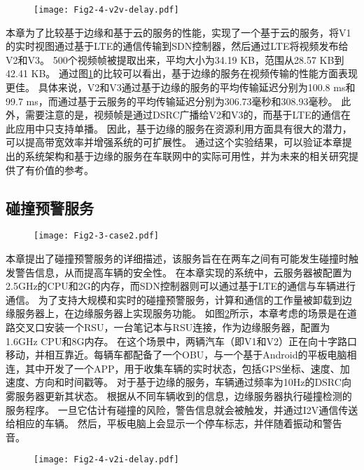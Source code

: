 \begin{figure}[h]
\centering
  \texttt{[image: Fig2-4-v2v-delay.pdf]}
  \label{fig 2-4}
\end{figure}

本章为了比较基于边缘和基于云的服务的性能，实现了一个基于云的服务，将V1的实时视图通过基于LTE的通信传输到SDN控制器，然后通过LTE将视频发布给V2和V3。
500个视频帧被提取出来，平均大小为34.19 KB，范围从28.57 KB到42.41 KB。
通过图\ref{fig 2-4}的比较可以看出，基于边缘的服务在视频传输的性能方面表现更佳。
具体来说，V2和V3通过基于边缘的服务的平均传输延迟分别为100.8 ms和99.7 ms，而通过基于云服务的平均传输延迟分别为306.73毫秒和308.93毫秒。
此外，需要注意的是，视频帧是通过DSRC广播给V2和V3的，而基于LTE的通信在此应用中只支持单播。
因此，基于边缘的服务在资源利用方面具有很大的潜力，可以提高带宽效率并增强系统的可扩展性。
通过这个实验结果，可以验证本章提出的系统架构和基于边缘的服务在车联网中的实际可用性，并为未来的相关研究提供了有价值的参考。

\subsection{碰撞预警服务}

\begin{figure}[h] 
	\centering
	\texttt{[image: Fig2-3-case2.pdf]}
	\label{fig 2-5}
\end{figure}

本章提出了碰撞预警服务的详细描述，该服务旨在在两车之间有可能发生碰撞时触发警告信息，从而提高车辆的安全性。
在本章实现的系统中，云服务器被配置为2.5GHz的CPU和2G的内存，而SDN控制器则可以通过基于LTE的通信与车辆进行通信。
为了支持大规模和实时的碰撞预警服务，计算和通信的工作量被卸载到边缘服务器上，在边缘服务器上实现服务功能。
如图\ref{fig 2-5}所示，本章考虑的场景是在道路交叉口安装一个RSU，一台笔记本与RSU连接，作为边缘服务器，配置为1.6GHz CPU和8G内存。
在这个场景中，两辆汽车（即V1和V2）正在向十字路口移动，并相互靠近。每辆车都配备了一个OBU，与一个基于Android的平板电脑相连，其中开发了一个APP，用于收集车辆的实时状态，包括GPS坐标、速度、加速度、方向和时间戳等。
对于基于边缘的服务，车辆通过频率为10Hz的DSRC向雾服务器更新其状态。
根据从不同车辆收到的信息，边缘服务器执行碰撞检测的服务程序。
一旦它估计有碰撞的风险，警告信息就会被触发，并通过I2V通信传送给相应的车辆。
然后，平板电脑上会显示一个停车标志，并伴随着振动和警告音。

\begin{figure}[h]
\centering
  \texttt{[image: Fig2-4-v2i-delay.pdf]}
  \label{fig 2-6}
\end{figure}

